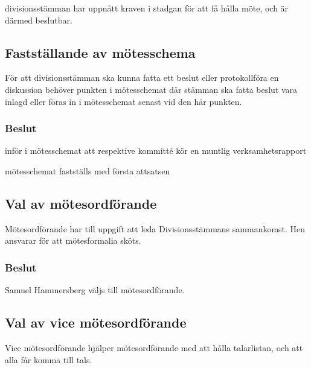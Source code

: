 \documentclass[protokoll]{dvd}
\begin{document}
\begin{attsatser}
	\item divisionsstämman har uppnått kraven i stadgan för att få hålla möte, och är därmed beslutbar.
\end{attsatser}

\subsection{Fastställande av mötesschema}

För att divisionsstämman ska kunna fatta ett beslut eller protokollföra en diskussion behöver punkten i mötesschemat där stämman ska fatta beslut vara inlagd eller föras in i mötesschemat senast vid den här punkten.

\subsubsection*{Beslut}

\begin{attsatser}
	\item inför i mötesschemat att respektive kommitté kör en muntlig verksamhetsrapport
    \item mötesschemat fastställs med första attsatsen
\end{attsatser}


\subsection{Val av mötesordförande}

Mötesordförande har till uppgift att leda Divisionsstämmans sammankomst.
Hen ansvarar för att mötesformalia sköts.

\subsubsection*{Beslut}

\begin{attsatser}
	\item Samuel Hammersberg väljs till mötesordförande.
\end{attsatser}


\subsection{Val av vice mötesordförande}

Vice mötesordförande hjälper mötesordförande med att hålla talarlistan, och att alla får komma till tals.
\end{document}
